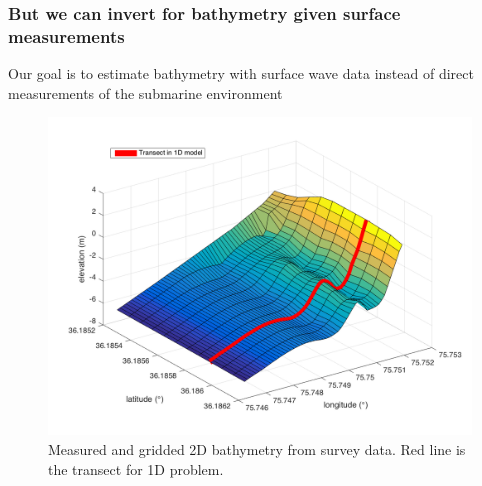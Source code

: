 \documentclass[7pt]{beamer}
\begin{document}

\begin{frame}
 \frametitle{But we can invert for bathymetry given surface measurements}

Our goal is to estimate bathymetry with surface wave data instead of direct measurements of the submarine environment

\begin{figure}[H]
	 	\centering
	 	\includegraphics[width=0.6\linewidth]{img/trueBath2D.png}
	 	\caption{Measured and gridded 2D bathymetry from survey data. Red line is the transect for 1D problem.}
	 	\label{2D Bath}
	 	\end{figure}

\end{frame}
\end{document}
